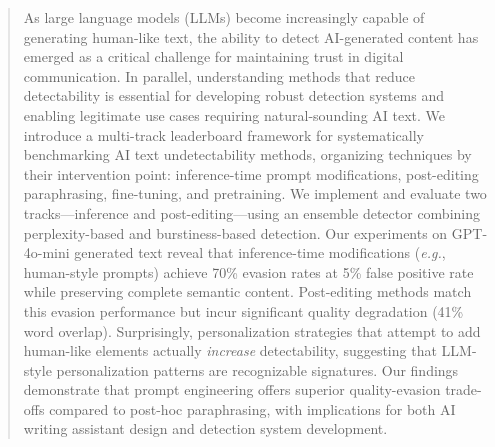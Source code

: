 \begin{abstract}
As large language models (LLMs) become increasingly capable of generating human-like text, the ability to detect AI-generated content has emerged as a critical challenge for maintaining trust in digital communication. In parallel, understanding methods that reduce detectability is essential for developing robust detection systems and enabling legitimate use cases requiring natural-sounding AI text. We introduce a multi-track leaderboard framework for systematically benchmarking AI text undetectability methods, organizing techniques by their intervention point: inference-time prompt modifications, post-editing paraphrasing, fine-tuning, and pretraining. We implement and evaluate two tracks---inference and post-editing---using an ensemble detector combining perplexity-based and burstiness-based detection. Our experiments on GPT-4o-mini generated text reveal that inference-time modifications (\textit{e.g.}, human-style prompts) achieve 70\% evasion rates at 5\% false positive rate while preserving complete semantic content. Post-editing methods match this evasion performance but incur significant quality degradation (41\% word overlap). Surprisingly, personalization strategies that attempt to add human-like elements actually \textit{increase} detectability, suggesting that LLM-style personalization patterns are recognizable signatures. Our findings demonstrate that prompt engineering offers superior quality-evasion trade-offs compared to post-hoc paraphrasing, with implications for both AI writing assistant design and detection system development.
\end{abstract}
